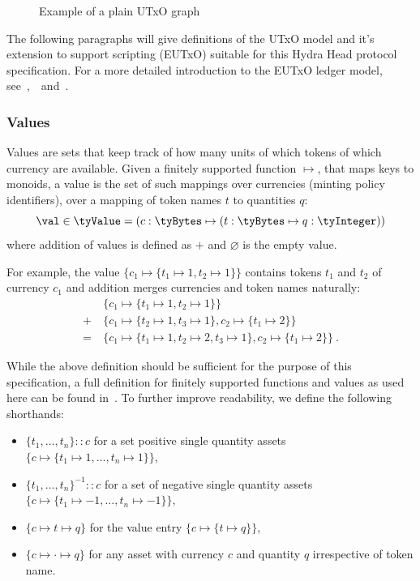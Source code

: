 \begin{figure}[h]
	\centering
        
	\caption{Example of a plain UTxO graph}\label{fig:utxo-graph}
\end{figure}

The following paragraphs will give definitions of the UTxO model and it's
extension to support scripting (EUTxO) suitable for this Hydra Head protocol
specification. For a more detailed introduction to the EUTxO ledger model,
see~\cite{eutxo},~\cite{eutxo-2}~and~\cite{utxo-ma}.

\subsubsection{Values}

\begin{definition}[Values]
	Values are sets that keep track of how many units of which tokens of which
	currency are available. Given a finitely supported function $\mapsto$, that
	maps keys to monoids, a value is the set of such mappings over currencies
	(minting policy identifiers), over a mapping of token names $t$ to
	quantities $q$:
	\[
		\val \in \tyValue = (c : \tyBytes \mapsto (t : \tyBytes \mapsto q : \tyInteger))
	\]
	\noindent where addition of values is defined as $+$ and $\varnothing$ is the empty value.
\end{definition}

For example, the value $\{c_{1} \mapsto \{t_1 \mapsto 1, t_2 \mapsto 1\}\}$
contains tokens $t_1$ and $t_2$ of currency $c_{1}$ and addition merges
currencies and token names naturally:
\begin{align*}
	     & \{c_{1} \mapsto \{t_1 \mapsto 1, t_2 \mapsto 1\}\}                                                        \\
	+ \  & \{c_{1} \mapsto \{t_{2} \mapsto 1, t_3 \mapsto 1\}, c_{2} \mapsto \{ t_{1} \mapsto 2\}\}                  \\
	= \  & \{c_{1} \mapsto \{t_1 \mapsto 1, t_2 \mapsto 2, t_3 \mapsto 1\}, c_{2} \mapsto \{ t_{1} \mapsto 2\}\} \ .
\end{align*}

While the above definition should be sufficient for the purpose of this
specification, a full definition for finitely supported functions and values as
used here can be found in~\cite{utxo-ma}. To further improve readability, we
define the following shorthands:
\begin{itemize}
	\item $\{t_1, \ldots, t_n\} :: c$ for a set positive single quantity assets
	      $\{c \mapsto \{t_1 \mapsto 1, \ldots, t_n \mapsto 1\}\}$,
	\item ${\{t_1, \ldots, t_n\}}^{-1} :: c$ for a set of negative single quantity assets
	      $\{c \mapsto \{t_1 \mapsto -1, \ldots, t_n \mapsto -1\}\}$,

	\item $\{c \mapsto t \mapsto q\}$ for the value entry $\{c \mapsto \{t \mapsto q\}\}$,
	\item $\{c \mapsto \cdot \mapsto q \}$ for any asset with currency $c$ and
	      quantity $q$ irrespective of token name.
\end{itemize}

